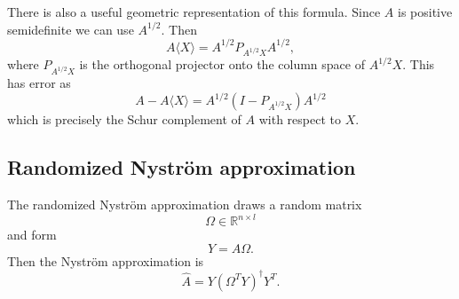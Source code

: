 \documentclass[11pt,a4paper]{article}
\begin{document}
There is also a useful geometric representation of this formula. Since $A$ is positive semidefinite we can use $A^{1/2} $. Then
\[
A\langle X\rangle=A^{1/2} P_{A^{1/2}X} A^{1/2},
\]
where $P_{A^{1/2}X}$ is the orthogonal projector onto the column space of $A^{1/2}X$. This has error as
\[
A - A\langle X\rangle=A^{1/2}(I-P_{A^{1/2}X})A^{1/2}
\]
which is precisely the Schur complement of $A$ with respect to $X$.

\subsection{Randomized Nystr\"om approximation}

The randomized Nystr\"om approximation draws a random matrix
\[
\Omega \in \mathbb{R}^{n \times l}
\]
and form
\[
Y = A\Omega.
\]
Then the Nystr\"om approximation is
\[
\hat{A}=Y(\Omega^TY)^\dagger Y^T.
\]
\end{document}

